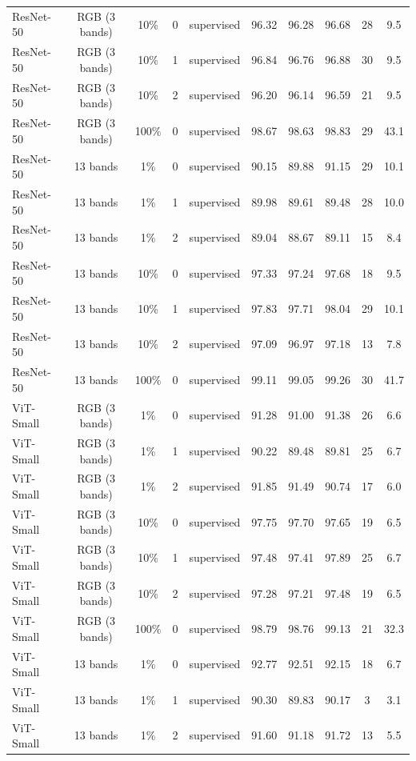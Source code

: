 \begin{table}[t]
\begin{tabular}{lccccccccc}
ResNet-50 & RGB (3 bands) & 10\% & 0 & supervised & 96.32 & 96.28 & 96.68 & 28 & 9.5 \\
ResNet-50 & RGB (3 bands) & 10\% & 1 & supervised & 96.84 & 96.76 & 96.88 & 30 & 9.5 \\
ResNet-50 & RGB (3 bands) & 10\% & 2 & supervised & 96.20 & 96.14 & 96.59 & 21 & 9.5 \\
ResNet-50 & RGB (3 bands) & 100\% & 0 & supervised & 98.67 & 98.63 & 98.83 & 29 & 43.1 \\
ResNet-50 & 13 bands & 1\% & 0 & supervised & 90.15 & 89.88 & 91.15 & 29 & 10.1 \\
ResNet-50 & 13 bands & 1\% & 1 & supervised & 89.98 & 89.61 & 89.48 & 28 & 10.0 \\
ResNet-50 & 13 bands & 1\% & 2 & supervised & 89.04 & 88.67 & 89.11 & 15 & 8.4 \\
ResNet-50 & 13 bands & 10\% & 0 & supervised & 97.33 & 97.24 & 97.68 & 18 & 9.5 \\
ResNet-50 & 13 bands & 10\% & 1 & supervised & 97.83 & 97.71 & 98.04 & 29 & 10.1 \\
ResNet-50 & 13 bands & 10\% & 2 & supervised & 97.09 & 96.97 & 97.18 & 13 & 7.8 \\
ResNet-50 & 13 bands & 100\% & 0 & supervised & 99.11 & 99.05 & 99.26 & 30 & 41.7 \\
ViT-Small & RGB (3 bands) & 1\% & 0 & supervised & 91.28 & 91.00 & 91.38 & 26 & 6.6 \\
ViT-Small & RGB (3 bands) & 1\% & 1 & supervised & 90.22 & 89.48 & 89.81 & 25 & 6.7 \\
ViT-Small & RGB (3 bands) & 1\% & 2 & supervised & 91.85 & 91.49 & 90.74 & 17 & 6.0 \\
ViT-Small & RGB (3 bands) & 10\% & 0 & supervised & 97.75 & 97.70 & 97.65 & 19 & 6.5 \\
ViT-Small & RGB (3 bands) & 10\% & 1 & supervised & 97.48 & 97.41 & 97.89 & 25 & 6.7 \\
ViT-Small & RGB (3 bands) & 10\% & 2 & supervised & 97.28 & 97.21 & 97.48 & 19 & 6.5 \\
ViT-Small & RGB (3 bands) & 100\% & 0 & supervised & 98.79 & 98.76 & 99.13 & 21 & 32.3 \\
ViT-Small & 13 bands & 1\% & 0 & supervised & 92.77 & 92.51 & 92.15 & 18 & 6.7 \\
ViT-Small & 13 bands & 1\% & 1 & supervised & 90.30 & 89.83 & 90.17 & 3 & 3.1 \\
ViT-Small & 13 bands & 1\% & 2 & supervised & 91.60 & 91.18 & 91.72 & 13 & 5.5 \\

\end{tabular}
\end{table}
